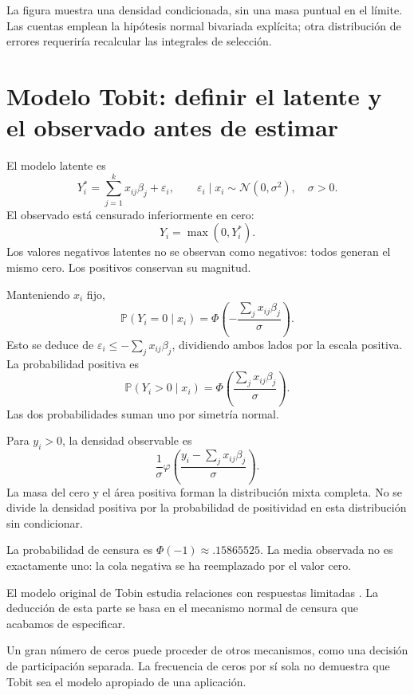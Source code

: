 \documentclass[11pt,a4paper]{article}
\newcommand{\Prob}{\mathbb P}
\begin{document}
La figura muestra una densidad condicionada,
sin una masa puntual en el límite.
Las cuentas emplean la hipótesis
normal bivariada explícita;
otra distribución de errores requeriría
recalcular las integrales de selección.

\clearpage
{}
\section{Modelo Tobit: definir el latente y el observado antes de estimar}\label{unidad84}
El modelo latente es
\[
Y_i^\ast=\sum_{j=1}^k x_{ij}\beta_j+\varepsilon_i,
\qquad\varepsilon_i\mid x_i\sim\mathcal N(0,\sigma^2),
\quad \sigma>0.
\]
El observado está censurado inferiormente en cero:
\[
Y_i=\max(0,Y_i^\ast).
\]
Los valores negativos latentes no se observan
como negativos: todos generan el mismo cero.
Los positivos conservan su magnitud.

Manteniendo \(x_i\) fijo,
\[
\Prob(Y_i=0\mid x_i)
=\Phi\left(-\frac{\sum_jx_{ij}\beta_j}{\sigma}\right).
\]
Esto se deduce de
\(\varepsilon_i\le-\sum_jx_{ij}\beta_j\),
dividiendo ambos lados por la escala positiva.
La probabilidad positiva es
\[
\Prob(Y_i>0\mid x_i)
=\Phi\left(\frac{\sum_jx_{ij}\beta_j}{\sigma}\right).
\]
Las dos probabilidades suman uno
por simetría normal.

Para \(y_i>0\), la densidad observable es
\[
\frac1\sigma
\varphi\left(\frac{y_i-\sum_jx_{ij}\beta_j}{\sigma}\right).
\]
La masa del cero y el área positiva
forman la distribución mixta completa.
No se divide la densidad positiva
por la probabilidad de positividad
en esta distribución sin condicionar.

\begin{ejemplo}
La probabilidad de censura es
\(\Phi(-1)\approx.15865525\).
La media observada no es exactamente uno:
la cola negativa se ha reemplazado
por el valor cero.
\end{ejemplo}
El modelo original de Tobin estudia
relaciones con respuestas limitadas \cite{tobin1958}.
La deducción de esta parte se basa
en el mecanismo normal de censura
que acabamos de especificar.

Un gran número de ceros puede proceder
de otros mecanismos, como una decisión
de participación separada.
La frecuencia de ceros por sí sola
no demuestra que Tobit sea
el modelo apropiado de una aplicación.
\end{document}
